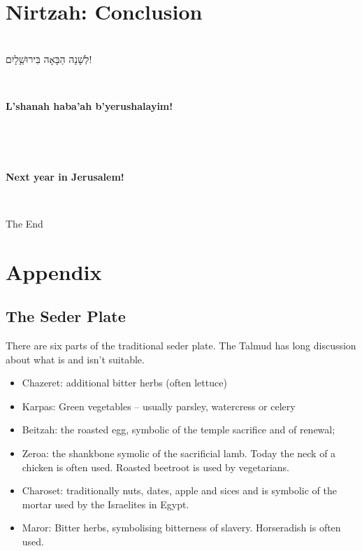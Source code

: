 \documentclass[12pt,a4wide,openany]{memoir}
\newcommand{\HgHL}[1]{{\large\textbf{#1}\par\noindent\\[-.5em]}}
\newenvironment{HgHebrew}{\begin{hebrew}\strut\\\noindent\Large}{\end{hebrew}}
\newenvironment{HgEnglish}{\strut\\\noindent}{\vspace{1em}}
\newenvironment{HgTranslit}{\strut\\\noindent\begin{itshape}}{\end{itshape}\vspace{1em}}
\begin{document}
\newpage
\chapter{Nirtzah: Conclusion}

\vfill

\begin{HgHebrew}
  לְשָׁנָה הַבָּאָה בִּירוּשַָׁלָיִם!
  \vspace{-1em}
\end{HgHebrew}

\begin{HgTranslit}
  \HgHL{L'shanah haba'ah b'yerushalayim!}
  \vspace{-3em}
\end{HgTranslit}

\begin{HgEnglish}
  \HgHL{Next year in Jerusalem!}
\end{HgEnglish}

\vfill
\begin{center}
  The End
\end{center}
\newpage

\appendix

\thispagestyle{empty}
\chapter{Appendix}
\vspace*{-1cm}
\section*{The Seder Plate}

There are six parts of the traditional seder plate. The Talmud has
long discussion about what is and isn't suitable.
\begin{itemize}
\item Chazeret: additional bitter herbs (often lettuce)
\item Karpas: Green vegetables -- usually parsley, watercress or
  celery
\item Beitzah: the roasted egg, symbolic of the temple sacrifice and
  of renewal;
\item Zeroa: the shankbone symolic of the sacrificial lamb. Today the
  neck of a chicken is often used. Roasted beetroot is used by vegetarians.
\item Charoset: traditionally nuts, dates, apple and sices and is symbolic of
  the mortar used by the Israelites in Egypt.
\item Maror: Bitter herbs, symbolising bitterness of
  slavery. Horseradish is often used.
\end{itemize}
\end{document}
